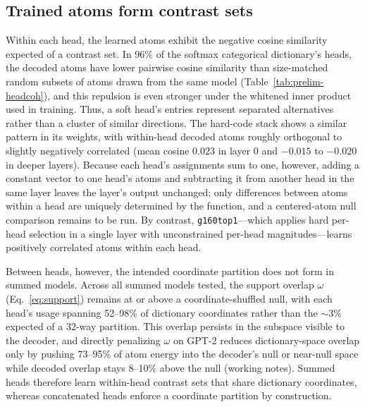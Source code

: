 \subsection{Trained atoms form contrast sets}
\label{sec:prelim-orth}
Within each head, the learned atoms exhibit the negative cosine
similarity expected of a contrast set. In 96\% of the softmax
categorical dictionary's heads, the decoded atoms have lower pairwise
cosine similarity than size-matched random subsets of atoms drawn from
the same model (Table~\ref{tab:prelim-headcoh}), and this repulsion is even
stronger under the whitened inner product used in training. Thus, a
soft head's entries represent separated alternatives rather than a
cluster of similar directions. The hard-code stack shows a similar
pattern in its weights, with within-head decoded atoms roughly orthogonal
to slightly negatively correlated (mean cosine $0.023$ in layer 0 and
$-0.015$ to $-0.020$ in deeper layers). Because each head's assignments
sum to one, however, adding a constant vector to one head's atoms and
subtracting it from another head in the same layer leaves the layer's
output unchanged; only differences between atoms within a head are
uniquely determined by the function, and a centered-atom null comparison
remains to be run. By contrast, \texttt{g160top1}---which applies hard
per-head selection in a single layer with unconstrained per-head
magnitudes---learns positively correlated atoms within each head.

Between heads, however, the intended coordinate partition does not form
in summed models. Across all summed models tested, the support overlap
$\omega$ (Eq.~\eqref{eq:support}) remains at or above a coordinate-shuffled
null, with each head's usage spanning 52--98\% of dictionary coordinates
rather than the ${\sim}3\%$ expected of a 32-way partition. This overlap
persists in the subspace visible to the decoder, and directly penalizing
$\omega$ on GPT-2 reduces dictionary-space overlap only by pushing
73--95\% of atom energy into the decoder's null or near-null space while
decoded overlap stays 8--10\% above the null (working notes). Summed
heads therefore learn within-head contrast sets that share dictionary
coordinates, whereas concatenated heads enforce a coordinate partition
by construction.

